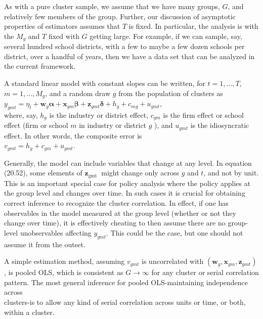 \documentclass[10pt]{article}
\begin{document}
As with a pure cluster sample, we assume that we have many groups, $G$, and relatively few members of the group. Further, our discussion of asymptotic properties of estimators assumes that $T$ is fixed. In particular, the analysis is with the $M_{g}$ and $T$ fixed with $G$ getting large. For example, if we can sample, say, several hundred school districts, with a few to maybe a few dozen schools per district, over a handful of years, then we have a data set that can be analyzed in the current framework.

A standard linear model with constant slopes can be written, for $t=1, \ldots, T$, $m=1, \ldots, M_{g}$, and a random draw $g$ from the population of clusters as\\
$y_{g m t}=\eta_{t}+\mathbf{w}_{g} \boldsymbol{\alpha}+\mathbf{x}_{g m} \boldsymbol{\beta}+\mathbf{z}_{g m t} \boldsymbol{\delta}+h_{g}+c_{m g}+u_{g m t}$,\\
where, say, $h_{g}$ is the industry or district effect, $c_{g m}$ is the firm effect or school effect (firm or school $m$ in industry or district $g$ ), and $u_{g m t}$ is the idiosyncratic effect. In other words, the composite error is\\
$v_{g m t}=h_{g}+c_{g m}+u_{g m t}$.

Generally, the model can include variables that change at any level. In equation (20.52), some elements of $\mathbf{z}_{\text {gmt }}$ might change only across $g$ and $t$, and not by unit. This is an important special case for policy analysis where the policy applies at the group level and changes over time. In such cases it is crucial for obtaining correct inference to recognize the cluster correlation. In effect, if one has observables in the model measured at the group level (whether or not they change over time), it is effectively cheating to then assume there are no group-level unobservables affecting $y_{g m t}$. This could be the case, but one should not assume it from the outset.

A simple estimation method, assuming $v_{g m t}$ is uncorrelated with $\left(\mathbf{w}_{g}, \mathbf{x}_{g m}, \mathbf{z}_{g m t}\right)$, is pooled OLS, which is consistent as $G \rightarrow \infty$ for any cluster or serial correlation pattern. The most general inference for pooled OLS-maintaining independence across\\
clusters-is to allow any kind of serial correlation across units or time, or both, within a cluster.
\end{document}
